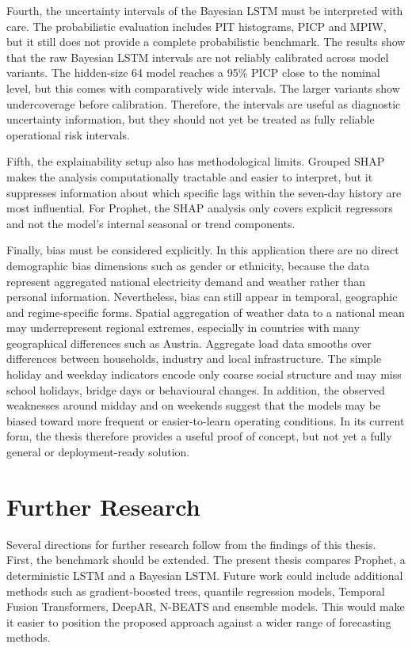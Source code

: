 \documentclass[Master,english,IEEE]{twbook}
\begin{document}
Fourth, the uncertainty intervals of the Bayesian LSTM must be interpreted with care. The probabilistic evaluation includes PIT histograms, PICP and MPIW, but it still does not provide a complete probabilistic benchmark. The results show that the raw Bayesian LSTM intervals are not reliably calibrated across model variants. The hidden-size 64 model reaches a 95\% PICP close to the nominal level, but this comes with comparatively wide intervals. The larger variants show undercoverage before calibration. Therefore, the intervals are useful as diagnostic uncertainty information, but they should not yet be treated as fully reliable operational risk intervals.

Fifth, the explainability setup also has methodological limits. Grouped SHAP makes the analysis computationally tractable and easier to interpret, but it suppresses information about which specific lags within the seven-day history are most influential. For Prophet, the SHAP analysis only covers explicit regressors and not the model's internal seasonal or trend components.

Finally, bias must be considered explicitly. In this application there are no direct demographic bias dimensions such as gender or ethnicity, because the data represent aggregated national electricity demand and weather rather than personal information. Nevertheless, bias can still appear in temporal, geographic and regime-specific forms. Spatial aggregation of weather data to a national mean may underrepresent regional extremes, especially in countries with many geographical differences such as Austria. Aggregate load data smooths over differences between households, industry and local infrastructure. The simple holiday and weekday indicators encode only coarse social structure and may miss school holidays, bridge days or behavioural changes. In addition, the observed weaknesses around midday and on weekends suggest that the models may be biased toward more frequent or easier-to-learn operating conditions. In its current form, the thesis therefore provides a useful proof of concept, but not yet a fully general or deployment-ready solution.

\section{Further Research}

Several directions for further research follow from the findings of this thesis. First, the benchmark should be extended. The present thesis compares Prophet, a deterministic LSTM and a Bayesian LSTM. Future work could include additional methods such as gradient-boosted trees, quantile regression models, Temporal Fusion Transformers, DeepAR, N-BEATS and ensemble models. This would make it easier to position the proposed approach against a wider range of forecasting methods.
\end{document}
